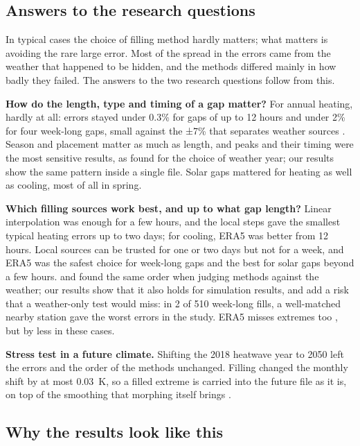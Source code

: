 \subsection{Answers to the research questions}\label{sec:6.1}

In typical cases the choice of filling method hardly matters; what matters is avoiding the rare large error. Most of the spread in the errors came from the weather that happened to be hidden, and the methods differed mainly in how badly they failed. The answers to the two research questions follow from this.

\textbf{How do the length, type and timing of a gap matter?} For annual heating, hardly at all: errors stayed under 0.3\% for gaps of up to 12 hours and under 2\% for four week-long gaps, small against the ±7\% that separates weather sources \citep{bhandari2012}. Season and placement matter as much as length, and peaks and their timing were the most sensitive results, as \citet{hong2013} found for the choice of weather year; our results show the same pattern inside a single file. Solar gaps mattered for heating as well as cooling, most of all in spring.

\textbf{Which filling sources work best, and up to what gap length?} Linear interpolation was enough for a few hours, and the local steps gave the smallest typical heating errors up to two days; for cooling, ERA5 was better from 12 hours. Local sources can be trusted for one or two days but not for a week, and ERA5 was the safest choice for week-long gaps and the best for solar gaps beyond a few hours. \citet{jacobs2024} and \citet{ieapvps2023} found the same order when judging methods against the weather; our results show that it also holds for simulation results, and add a risk that a weather-only test would miss: in 2 of 510 week-long fills, a well-matched nearby station gave the worst errors in the study. ERA5 misses extremes too \citep{lopes2024,yu2026}, but by less in these cases.

\textbf{Stress test in a future climate.} Shifting the 2018 heatwave year to 2050 left the errors and the order of the methods unchanged. Filling changed the monthly shift by at most 0.03~K, so a filled extreme is carried into the future file as it is, on top of the smoothing that morphing itself brings \citep{machard2020}.

\subsection{Why the results look like this}\label{sec:6.2}

